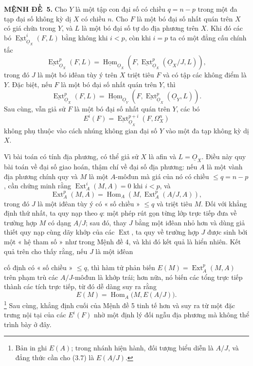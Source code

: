 \documentclass[11pt,twoside,openany]{book}
\numberwithin{equation}{section}
\newcommand{\src}[1]{%
  \phantomsection\hypertarget{src:\fgasourceid:#1}{}%
  \marginpar{\raggedleft\footnotesize\sffamily #1}%
}
\newcommand{\fgasourceid}{unset}
\newcommand{\Osh}{\underline{O}}
\newcommand{\Homsh}{\underline{\operatorname{Hom}}}
\newcommand{\Extsh}{\underline{\operatorname{Ext}}}
\newcommand{\result}[2]{\par\medskip\noindent\textbf{#1\if\relax\detokenize{#2}\relax\else\ #2\fi.}\quad}
\begin{document}
\result{MỆNH ĐỀ}{5} Cho $Y$ là một tập con đại số có chiều
$q=n-p$ trong một đa tạp đại số không kỳ dị $X$ có chiều $n$. Cho
$F$ là một bó đại số nhất quán trên $X$ có giá chứa trong $Y$, và $L$
là một bó đại số tự do địa phương trên $X$. Khi đó các bó
$\Extsh_{\Osh_X}^{i}(F,L)$ bằng không khi $i<p$, còn khi $i=p$ ta có một
đẳng cấu chính tắc
\begin{equation}\tag{3.7}
  \Extsh_{\Osh_X}^{p}(F,L)
  =\Homsh_{\Osh_X}\!\left(F,
  \Extsh_{\Osh_X}^{p}(\Osh_X/J,L)\right),
\end{equation}
trong đó $J$ là một bó iđêan tùy ý trên $X$ triệt tiêu $F$ và có
tập các không điểm là $Y$. Đặc biệt, nếu $F$ là một bó đại số
nhất quán trên $Y$, thì
\begin{equation}\tag{3.7 bis}
  \Extsh_{\Osh_X}^{p}(F,L)
  =\Homsh_{\Osh_Y}\!\left(F,\Extsh_{\Osh_X}^{p}(\Osh_Y,L)\right).
\end{equation}
Sau cùng, vẫn giả sử $F$ là một bó đại số nhất quán trên $Y$, các bó
\[
  E^{i}(F)=\Extsh_{\Osh_X}^{p+i}(F,\Omega_X^{n})
\]
không phụ thuộc vào cách nhúng không gian đại số $Y$ vào một đa tạp
không kỳ dị $X$.

Vì bài toán có tính địa phương, có thể giả sử $X$ là afin và $L=\Osh_X$. Điều này quy
bài toán về đại số giao hoán, thậm chí về đại số địa phương: nếu $A$ là một
vành địa phương chính quy và $M$ là một $A$-môđun mà giá của nó có chiều
$\leq q=n-p$, cần chứng minh rằng $\operatorname{Ext}_{A}^{i}(M,A)=0$ khi $i<p$, và
\[
  \operatorname{Ext}_{A}^{p}(M,A)
  =\operatorname{Hom}_{A}\!\left(M,\operatorname{Ext}_{A}^{p}(A/J,A)\right),
\]
trong đó $J$ là một iđêan tùy ý có « số chiều » $\leq q$ và triệt tiêu $M$. Đối với
khẳng định thứ nhất, ta quy nạp theo $q$: một phép rút gọn từng lớp trực tiếp đưa
về trường hợp $M$ có dạng $A/J$; sau đó, thay $J$ bằng một iđêan nhỏ hơn
và dùng giả thiết quy nạp cùng dãy khớp của các
$\operatorname{Ext}$, ta quy về trường hợp $J$ được sinh bởi một « hệ tham số »
như trong Mệnh đề 4, và khi đó kết quả là hiển nhiên. Kết quả
trên cho thấy rằng, nếu $J$ là một iđêan

\src{177}
cố định có « số chiều » $\leq q$, thì hàm tử phản biến
$E(M)=\operatorname{Ext}_{A}^{p}(M,A)$ trên phạm trù các $A/J$-môđun là
khớp trái; hơn nữa, nó biến các tổng trực tiếp thành các tích trực tiếp,
từ đó dễ dàng suy ra rằng
\[
  E(M)=\operatorname{Hom}_{A}\bigl(M,E(A/J)\bigr).
\]
\footnote{Bản in ghi $E(A)$; trong nhánh hiện hành, đối tượng
biểu diễn là $A/J$, và đẳng thức cần cho (3.7) là $E(A/J)$.} Sau cùng,
khẳng định cuối của Mệnh đề 5 tinh tế hơn và suy ra từ một
đặc trưng nội tại của các $E^{i}(F)$ nhờ một định lý đối ngẫu
địa phương mà không thể trình bày ở đây.
\end{document}
